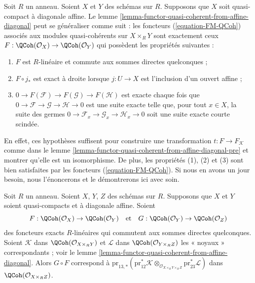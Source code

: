 \begin{remark}
\label{remark-characterize-FM-QCoh}
Soit $R$ un anneau. Soient $X$ et $Y$ des schémas sur $R$. Supposons que $X$
soit quasi-compact à diagonale affine.
Le lemme \ref{lemma-functor-quasi-coherent-from-affine-diagonal} peut
se généraliser comme suit : les foncteurs
(\ref{equation-FM-QCoh}) associés aux modules quasi-cohérents sur
$X \times_R Y$ sont exactement ceux
$F : \QCoh(\mathcal{O}_X) \to \QCoh(\mathcal{O}_Y)$
qui possèdent les propriétés suivantes :
\begin{enumerate}
\item $F$ est $R$-linéaire et commute aux sommes directes quelconques ;
\item $F \circ j_*$ est exact à droite lorsque $j : U \to X$ est
l'inclusion d'un ouvert affine ;
\item $0 \to F(\mathcal{F}) \to F(\mathcal{G}) \to F(\mathcal{H})$
est exacte chaque fois que $0 \to \mathcal{F} \to \mathcal{G} \to \mathcal{H} \to 0$
est une suite exacte telle que, pour tout $x \in X$, la suite des germes
$0 \to \mathcal{F}_x \to \mathcal{G}_x \to \mathcal{H}_x \to 0$
soit une suite exacte courte scindée.
\end{enumerate}
En effet, ces hypothèses suffisent pour construire une transformation
$t : F \to F_\mathcal{K}$ comme dans le
lemme \ref{lemma-functor-quasi-coherent-from-affine-diagonal-pre}
et montrer qu'elle est un isomorphisme. De plus, les propriétés (1), (2) et (3)
sont bien satisfaites par les foncteurs (\ref{equation-FM-QCoh}).
Si nous en avons un jour besoin, nous l'énoncerons et le démontrerons ici avec soin.
\end{remark}

\begin{lemma}
\label{lemma-compose-FM-QCoh}
Soit $R$ un anneau. Soient $X$, $Y$, $Z$ des schémas sur $R$. Supposons que
$X$ et $Y$ soient quasi-compacts et à diagonale affine. Soient
$$
F : \QCoh(\mathcal{O}_X) \to \QCoh(\mathcal{O}_Y)
\quad\text{et}\quad
G : \QCoh(\mathcal{O}_Y) \to \QCoh(\mathcal{O}_Z)
$$
des foncteurs exacts $R$-linéaires qui commutent aux sommes directes quelconques.
Soient $\mathcal{K}$ dans $\QCoh(\mathcal{O}_{X \times_R Y})$
et $\mathcal{L}$ dans $\QCoh(\mathcal{O}_{Y \times_R Z})$
les « noyaux » correspondants ; voir le
lemme \ref{lemma-functor-quasi-coherent-from-affine-diagonal}.
Alors $G \circ F$ correspond à
$\text{pr}_{13, *}(\text{pr}_{12}^*\mathcal{K}
\otimes_{\mathcal{O}_{X \times_R Y \times_R Z}}
\text{pr}_{23}^*\mathcal{L})$ dans $\QCoh(\mathcal{O}_{X \times_R Z})$.
\end{lemma}


